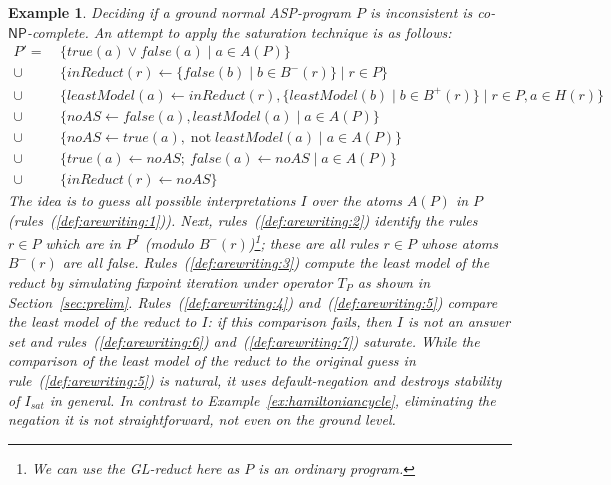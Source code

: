 \documentclass[11pt,fleqn,twoside]{article}
\def\naf{\ensuremath{\mathop{not}}}
\newcommand{\conp}{co-\ensuremath{\mathsf{NP}}\xspace}
\newcommand{\Program}{\ensuremath{P}}
\newtheorem{example}{Example}
\begin{document}
			\begin{example}
				\label{ex:aspinconsistency}
				Deciding if a ground normal ASP-program $\Program$ is inconsistent is \conp-complete.
				An attempt to apply the saturation technique is as follows:
				{
				\begin{align}
					P' = & \ \{ \mathit{true}(a) \vee \mathit{false}(a) \mid a \in A(P) \} \label{def:arewriting:1} \\
						\cup & \ \{ \mathit{inReduct}(r) \leftarrow \{ \mathit{false}(b) \mid b \in B^{-}(r) \} \mid r \in P \} \label{def:arewriting:2} \\
						\cup & \ \{ \mathit{leastModel}(a) \leftarrow \mathit{inReduct}(r), \{ \mathit{leastModel}(b) \mid b \in B^{+}(r) \} \mid r \in P, a \in H(r) \} \label{def:arewriting:3} \\
						\cup & \ \{ \mathit{noAS} \leftarrow \mathit{false}(a), \mathit{leastModel}(a) \mid a \in A(P) \} \label{def:arewriting:4} \\
						\cup & \ \{ \mathit{noAS} \leftarrow \mathit{true}(a), \naf \mathit{leastModel}(a) \mid a \in A(P) \} \label{def:arewriting:5} \\
						\cup & \ \{ \mathit{true}(a) \leftarrow \mathit{noAS}; \ \mathit{false}(a) \leftarrow \mathit{noAS} \mid a \in A(P) \} \label{def:arewriting:6} \\
						\cup & \ \{ \mathit{inReduct}(r) \leftarrow \mathit{noAS} \} \label{def:arewriting:7}
				\end{align}
				}
				The idea is to guess all possible interpretations $I$ over the atoms $A(P)$ in $\Program$ (rules~(\ref{def:arewriting:1})).
				Next, rules~(\ref{def:arewriting:2}) identify the rules $r \in P$ which are in $P^I$ (modulo $B^{-}(r)$)\footnote{We can use the GL-reduct here as $P$ is an ordinary program.}; these are all rules $r \in P$ whose atoms $B^{-}(r)$ are all false.
				Rules~(\ref{def:arewriting:3}) compute the least model of the reduct by simulating fixpoint iteration under operator $T_P$ as shown in Section~\ref{sec:prelim}.
				Rules~(\ref{def:arewriting:4}) and~(\ref{def:arewriting:5}) compare the least model of the reduct to $I$:
				if this comparison fails, then $I$ is not an answer set and rules~(\ref{def:arewriting:6}) and~(\ref{def:arewriting:7}) saturate.
				While the comparison of the least model of the reduct to the original guess in rule~(\ref{def:arewriting:5}) is natural, it uses default-negation
				and destroys stability of $I_{\mathit{sat}}$ in general.
				In contrast to Example~\ref{ex:hamiltoniancycle}, eliminating the negation it is not straightforward, not even on the ground level.
			\end{example}
			
\end{document}
